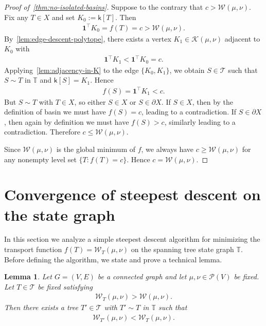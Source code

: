 \documentclass[11pt,a4paper]{article}
\newcommand{\prob}{{\mathscr{P}}}
\newcommand{\wass}{{\mathcal{W}}}
\newcommand{\setoftrees}{{\mathcal{T}}}
\newcommand{\stategraph}{{\mathbb{T}}}
\newcommand{\embedding}{{\mathsf{k}}}
\newcommand{\flowpoly}{{\mathcal{K}}}
\newtheorem{lemma}[theorem]{Lemma}
\begin{document}
\begin{proof}[Proof of~\cref{thm:no-isolated-basins}]
    Suppose to the contrary that $c>\wass(\mu,\nu)$. Fix any $T\in X$ and set $K_0:=\embedding[T]$. Then
        \begin{align*}
            \mathbf{1}^\top K_0 = f(T)=c>\wass(\mu,\nu).
        \end{align*}
    By~\cref{lem:edge-descent-polytope}, there exists a vertex $K_1\in\flowpoly(\mu,\nu)$ adjacent to $K_0$ with
        \begin{align*}
            \mathbf{1}^\top K_1 < \mathbf{1}^\top K_0 = c.
        \end{align*}
    Applying~\cref{lem:adjacency-in-K} to the edge $\{K_0,K_1\}$, we obtain $S\in\setoftrees$ such that $S\sim T$ in $\stategraph$ and $\embedding[S]=K_1$. Hence
        \begin{align*}
            f(S)=\mathbf{1}^\top K_1 < c.
        \end{align*}
    But $S\sim T$ with $T\in X$, so either $S\in X$ or $S\in\partial X$. If $S\in X$, then by the definition of basin we must have $f(S)=c$, leading to a contradiction. If $S\in\partial X$, then again by definition we must have $f(S)>c$, similarly leading to a contradiction. Therefore $c\le \wass(\mu,\nu)$.

    Since $\wass(\mu,\nu)$ is the global minimum of $f$, we always have $c\ge \wass(\mu,\nu)$ for any nonempty level set $\{T: f(T)=c\}$. Hence $c=\wass(\mu,\nu)$.
\end{proof}

\section{Convergence of steepest descent on the state graph}\label{sec:steepest-descent}

In this section we analyze a simple steepest descent algorithm for minimizing the transport function $f(T) = \wass_T(\mu,\nu)$ on the spanning tree state graph $\stategraph$. Before defining the algorithm, we state and prove a technical lemma.

\begin{lemma}\label{lem:descent-step}
    Let $G=(V,E)$ be a connected graph and let $\mu,\nu\in\prob(V)$ be fixed. Let $T\in\setoftrees$ be fixed satisfying
        \begin{align*}
            \wass_T(\mu,\nu) > \wass(\mu,\nu).
        \end{align*}
    Then there exists a tree $T'\in\setoftrees$ with $T'\sim T$ in $\stategraph$ such that
        \begin{align*}
            \wass_{T'}(\mu,\nu) < \wass_T(\mu,\nu).
        \end{align*}
\end{lemma}
\end{document}
